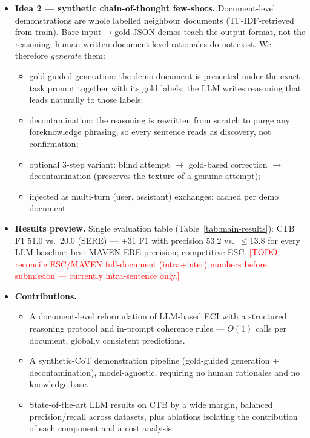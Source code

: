 \documentclass[11pt]{article}
\newcommand{\todo}[1]{\textcolor{red}{[TODO: #1]}}
\begin{document}
\begin{itemize}
        ranking $\to$ final JSON) plus explicit coherence rules (symmetry,
        dataset-specific transitivity). This shifts the burden from external
        orchestration to the model's own long-context reasoning --- deliberately
        betting on model quality, so the method \emph{improves as models improve}.
  \item \textbf{Idea 2 --- synthetic chain-of-thought few-shots.} Document-level
        demonstrations are whole labelled neighbour documents (TF-IDF-retrieved
        from train). Bare input$\to$gold-JSON demos teach the output format, not
        the reasoning; human-written document-level rationales do not exist.
        We therefore \emph{generate} them:
        \begin{itemize}
          \item gold-guided generation: the demo document is presented under the
                exact task prompt together with its gold labels; the LLM writes
                reasoning that leads naturally to those labels;
          \item decontamination: the reasoning is rewritten from scratch to
                purge any foreknowledge phrasing, so every sentence reads as
                discovery, not confirmation;
          \item optional 3-step variant: blind attempt $\to$ gold-based
                correction $\to$ decontamination (preserves the texture of a
                genuine attempt);
          \item injected as multi-turn (user, assistant) exchanges; cached per
                demo document.
        \end{itemize}
  \item \textbf{Results preview.} Single evaluation table
        (Table~\ref{tab:main-results}): CTB F1 51.0 vs.\ 20.0 (SERE) --- +31 F1
        with precision 53.2 vs.\ $\le$13.8 for every LLM baseline; best MAVEN-ERE
        precision; competitive ESC. \todo{reconcile ESC/MAVEN full-document (intra+inter)
        numbers before submission --- currently intra-sentence only.}
  \item \textbf{Contributions.}
        \begin{itemize}
          \item A document-level reformulation of LLM-based ECI with a structured
                reasoning protocol and in-prompt coherence rules --- $O(1)$ calls
                per document, globally consistent predictions.
          \item A synthetic-CoT demonstration pipeline (gold-guided generation +
                decontamination), model-agnostic, requiring no human rationales
                and no knowledge base.
          \item State-of-the-art LLM results on CTB by a wide margin, balanced
                precision/recall across datasets, plus ablations isolating the
                contribution of each component and a cost analysis.
        \end{itemize}
\end{itemize}
\end{document}
